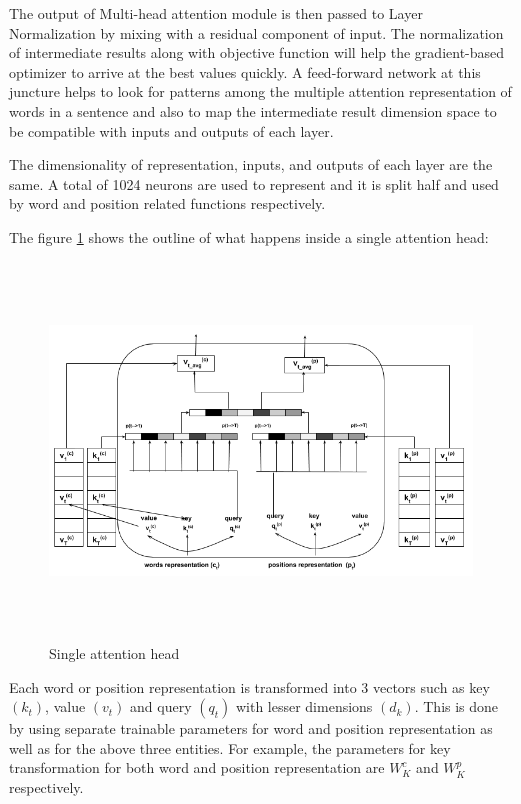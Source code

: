 \documentclass[a4paper, 11pt]{article}
\begin{document}
The output of Multi-head attention module is then passed to Layer Normalization by mixing with a residual component of input. The normalization of intermediate results along with objective function will help the gradient-based optimizer to arrive at the best values quickly. A feed-forward network at this juncture helps to look for patterns among the multiple attention representation of words in a sentence and also to map the intermediate result dimension space to be compatible with inputs and outputs of each layer.  

The dimensionality of representation, inputs, and outputs of each layer are the same. A total of 1024 neurons are used to represent and it is split half and used by word and position related functions respectively. 


The figure \ref{fig:single_attention_head} shows the outline of what happens inside a single attention head:

\begin{figure}[htpb]
    \centering
    \includegraphics[width=\textwidth,height=10cm,keepaspectratio=true]
    {single-head-attention.png}
    \caption{
        Single attention head
    }
    \label{fig:single_attention_head}
\end{figure}


Each word or position representation is transformed into 3 vectors such as key $(k_t)$,  value $(v_t)$ and query $(q_t)$ with lesser dimensions $(d_k)$. This is done by using separate trainable parameters for word and position representation as well as for the above three entities. For example, the parameters for key transformation for both word and position representation are $W^{c}_K$ and $W^{p}_K$ respectively.
\end{document}
